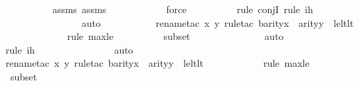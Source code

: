 \begin{isabellebody}
\ \ \ \ \ \ \ \ \isamarkupfalse%
\ assms{}\ assms{}\isanewline
\ \ \ \ \ \ \ \ \ \ \isamarkupfalse%
\ force\isanewline
\ \ \ \ \ \ \ \ \ \isamarkupfalse%
{\isacharparenleft}{\kern0pt}rule\ conjI{\isacharcomma}{\kern0pt}\ rule\ ih{\isacharparenright}{\kern0pt}\isanewline
\ \ \ \ \ \ \ \ \ \ \ \ \ \ \isamarkupfalse%
\ auto{\isacharbrackleft}{\kern0pt}{}{\isacharbrackright}{\kern0pt}\isanewline
\ \ \ \ \ \ \ \ \ \ \isamarkupfalse%
{\isacharparenleft}{\kern0pt}rename{\isacharunderscore}{\kern0pt}tac\ x\ y{\isacharcomma}{\kern0pt}\ rule{\isacharunderscore}{\kern0pt}tac\ b{\isacharequal}{\kern0pt}{\isachardoublequoteopen}arity{\isacharparenleft}{\kern0pt}x{\isacharparenright}{\kern0pt}\ {\isasymunion}\ arity{\isacharparenleft}{\kern0pt}y{\isacharparenright}{\kern0pt}{\isachardoublequoteclose}\ \ le{\isacharunderscore}{\kern0pt}lt{\isacharunderscore}{\kern0pt}lt{\isacharparenright}{\kern0pt}\isanewline
\ \ \ \ \ \ \ \ \ \ \ \ \isamarkupfalse%
{\isacharparenleft}{\kern0pt}rule\ max{\isacharunderscore}{\kern0pt}le{}{\isacharparenright}{\kern0pt}\isanewline
\ \ \ \ \ \ \ \ \isamarkupfalse%
\ {\isasymDelta}{}{\isacharunderscore}{\kern0pt}subset\isanewline
\ \ \ \ \ \ \ \ \ \ \ \ \ \isamarkupfalse%
\ auto{\isacharbrackleft}{\kern0pt}{}{\isacharbrackright}{\kern0pt}\isanewline
\ \ \ \ \ \ \ \ \ \ \isamarkupfalse%
{\isacharparenleft}{\kern0pt}rule\ ih{\isacharparenright}{\kern0pt}\isanewline
\ \ \ \ \ \ \ \ \ \ \ \ \ \ \isamarkupfalse%
\ auto{\isacharbrackleft}{\kern0pt}{}{\isacharbrackright}{\kern0pt}\isanewline
\ \ \ \ \ \ \ \ \ \ \isamarkupfalse%
{\isacharparenleft}{\kern0pt}rename{\isacharunderscore}{\kern0pt}tac\ x\ y{\isacharcomma}{\kern0pt}\ rule{\isacharunderscore}{\kern0pt}tac\ b{\isacharequal}{\kern0pt}{\isachardoublequoteopen}arity{\isacharparenleft}{\kern0pt}x{\isacharparenright}{\kern0pt}\ {\isasymunion}\ arity{\isacharparenleft}{\kern0pt}y{\isacharparenright}{\kern0pt}{\isachardoublequoteclose}\ \ le{\isacharunderscore}{\kern0pt}lt{\isacharunderscore}{\kern0pt}lt{\isacharparenright}{\kern0pt}\isanewline
\ \ \ \ \ \ \ \ \ \ \ \isamarkupfalse%
{\isacharparenleft}{\kern0pt}rule\ max{\isacharunderscore}{\kern0pt}le{}{\isacharparenright}{\kern0pt}\isanewline
\ \ \ \ \ \ \ \ \isamarkupfalse%
\ {\isasymDelta}{}{\isacharunderscore}{\kern0pt}subset\isanewline

\end{isabellebody}
